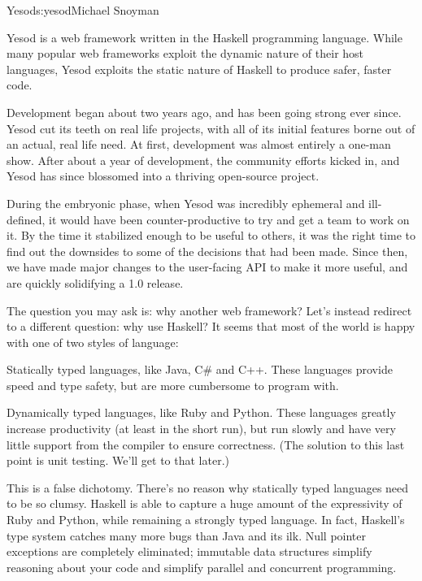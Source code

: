\begin{aosachapter}{Yesod}{s:yesod}{Michael Snoyman}

Yesod is a web framework written in the Haskell programming
language. While many popular web frameworks exploit the dynamic nature
of their host languages, Yesod exploits the static nature of Haskell
to produce safer, faster code.

Development began about two years ago, and has been going strong ever
since. Yesod cut its teeth on real life projects, with all of its
initial features borne out of an actual, real life need. At first,
development was almost entirely a one-man show. After about a year of
development, the community efforts kicked in, and Yesod has since
blossomed into a thriving open-source project.

During the embryonic phase, when Yesod was incredibly ephemeral and
ill-defined, it would have been counter-productive to try and get a
team to work on it. By the time it stabilized enough to be useful to
others, it was the right time to find out the downsides to some of the
decisions that had been made. Since then, we have made major changes
to the user-facing API to make it more useful, and are quickly
solidifying a 1.0 release.

The question you may ask is: why another web framework? Let's instead
redirect to a different question: why use Haskell? It seems that most
of the world is happy with one of two styles of language:

\begin{aosaitemize}

\item Statically typed languages, like Java, C\# and C++. These
  languages provide speed and type safety, but are more cumbersome to
  program with.

\item Dynamically typed languages, like Ruby and Python. These
  languages greatly increase productivity (at least in the short run),
  but run slowly and have very little support from the compiler to
  ensure correctness. (The solution to this last point is unit
  testing. We'll get to that later.)

\end{aosaitemize}

This is a false dichotomy. There's no reason why statically typed
languages need to be so clumsy. Haskell is able to capture a huge
amount of the expressivity of Ruby and Python, while remaining a
strongly typed language. In fact, Haskell's type system catches many
more bugs than Java and its ilk. Null pointer exceptions are
completely eliminated; immutable data structures simplify reasoning
about your code and simplify parallel and concurrent programming.


\end{aosachapter}
